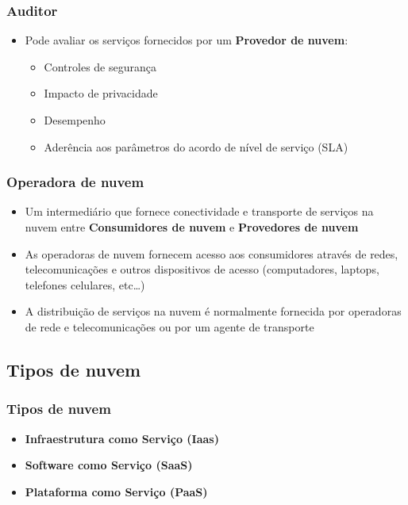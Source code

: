 \begin{frame}
	\frametitle{Auditor}
	\begin{itemize}
		\item Pode avaliar os serviços fornecidos por um \textbf{Provedor de nuvem}:
			\begin{itemize}
				\item Controles de segurança
				\item Impacto de privacidade
				\item Desempenho
				\item Aderência aos parâmetros do acordo de nível de serviço (SLA)
			\end{itemize}
	\end{itemize}
\end{frame}

\begin{frame}
	\frametitle{Operadora de nuvem}
	\begin{itemize}
		\item Um intermediário que fornece conectividade e transporte de serviços na nuvem entre \textbf{Consumidores de nuvem} e \textbf{Provedores de nuvem}
		\item As operadoras de nuvem fornecem acesso aos consumidores através de redes, telecomunicações e outros dispositivos de acesso (computadores, laptops, telefones celulares, etc\dots)
		\item A distribuição de serviços na nuvem é normalmente fornecida por operadoras de rede e telecomunicações ou por um agente de transporte
	\end{itemize}
\end{frame}

\subsection{Tipos de nuvem}

\begin{frame}
	\frametitle{Tipos de nuvem}
	\begin{itemize}
		\item \textbf{Infraestrutura como Serviço (Iaas)}
		\item \textbf{Software como Serviço (SaaS)}
		\item \textbf{Plataforma como Serviço (PaaS)}
	\end{itemize}
\end{frame}

